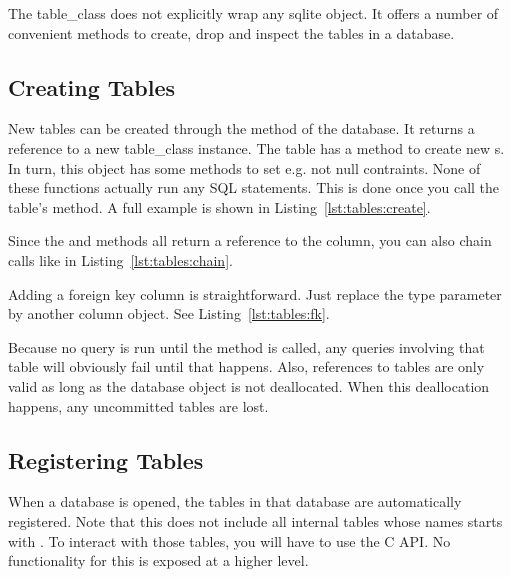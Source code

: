 The \gls{table_class} does not explicitly wrap any \gls{sqlite} object. It offers a number of convenient methods to create, drop and inspect the tables in a database.

\subsection{Creating Tables}
\label{section:tables:create}

New tables can be created through the  method of the database. It returns a reference to a new \gls{table_class} instance. The table has a method to create new s. In turn, this object has some methods to set e.g. not null contraints. None of these functions actually run any SQL statements. This is done once you call the table's  method.  A full example is shown in Listing~\ref{lst:tables:create}.



Since the  and  methods all return a reference to the column, you can also chain calls like in Listing~\ref{lst:tables:chain}.



Adding a foreign key column is straightforward. Just replace the type parameter by another column object. See Listing~\ref{lst:tables:fk}.



Because no  query is run until the  method is called, any queries involving that table will obviously fail until that happens. Also, references to tables are only valid as long as the database object is not deallocated. When this deallocation happens, any uncommitted tables are lost.

\subsection{Registering Tables}
\label{section:tables:register}

When a database is opened, the tables in that database are automatically registered. Note that this does not include all internal tables whose names starts with . To interact with those tables, you will have to use the C API. No functionality for this is exposed at a higher level.

